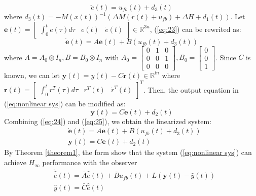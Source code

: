 \documentclass{ieeeaccess}
\begin{document}
\begin{equation} \label{eq:23}
    \ddot{e}(t) = u_{fb}(t) + d_3(t)
\end{equation}
where $d_3(t) = -M(x(t))^{-1}(\Delta M(\ddot{r}(t)+u_{fb}) + \Delta H + d_1(t))$. Let $\pmb{e}(t)=\begin{bmatrix}
    \int_{0}^{t}e(\tau)d\tau & e(t) & \dot{e}(t)
\end{bmatrix}\in\mathbb{R}^{3n}$, (\ref{eq:23}) can be rewrited as:
\begin{equation} \label{eq:24}
    \dot{\pmb{e}}(t)=A\pmb{e}(t)+B(u_{fb}(t)+d_3(t))
\end{equation}
where $ A = A_0\otimes I_n, B = B_0\otimes I_n$
with $A_0 = \begin{bmatrix}
    0 & 1 & 0 \\ 0 & 0 & 1 \\ 0 & 0 & 0
\end{bmatrix}, B_0 = \begin{bmatrix}
0 \\ 0 \\ 1
\end{bmatrix} $. Since $C$ is known, we can let $\pmb{y}(t) = y(t) - C\pmb{r}(t)\in\mathbb{R}^{ln}$ where $\pmb{r}(t) = \begin{bmatrix}
    \int_{0}^{t} r^T(\tau) d\tau & r^T(t) & \dot{r}^T(t)
\end{bmatrix}^T$. Then, the output equation in (\ref{eq:nonlinear sys}) can be modified as:
\begin{equation} \label{eq:25}
    \pmb{y}(t) = C\pmb{e}(t) + d_2(t)
\end{equation}
Combining (\ref{eq:24}) and (\ref{eq:25}), we obtain the linearized system:
\begin{equation} \label{eq:linear sys}
    \begin{split}
        & \dot{\pmb{e}}(t)=A\pmb{e}(t)+B(u_{fb}(t)+d_3(t)) \\
        & \pmb{y}(t)=C\pmb{e}(t)+d_2(t)   
    \end{split}  
\end{equation}
By Theorem \ref{theorem1}, the form show that the system (\ref{eq:nonlinear sys}) can achieve $H_\infty$ performance with the observer
\begin{equation} \label{eq:linear obs}
    \begin{split}
        & \dot{\hat{\bar{e}}}(t)=\bar{A}\hat{\bar{e}}(t) + \bar{B}u_{fb}(t) + L(\pmb{y}(t)-\hat{y}(t)) \\
        & \hat{y}(t)=\bar{C}\hat{\bar{e}}(t)   
    \end{split}  
\end{equation}
\end{document}
